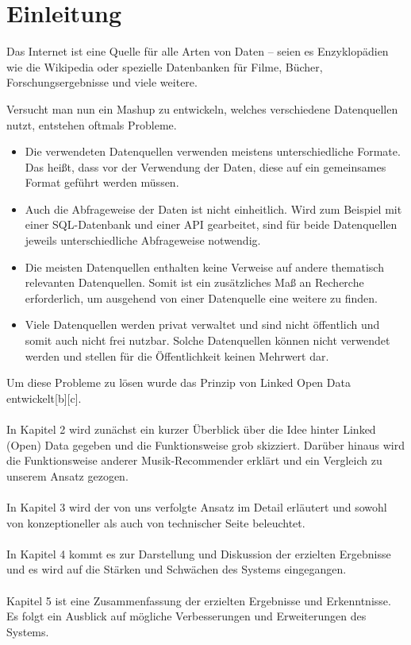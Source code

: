 \section{Einleitung}

Das Internet ist eine Quelle für alle Arten von Daten -- seien es Enzyklopädien wie die Wikipedia oder spezielle Datenbanken für Filme, Bücher, Forschungsergebnisse und viele weitere.


Versucht man nun ein Mashup zu entwickeln, welches verschiedene Datenquellen nutzt, entstehen oftmals Probleme.

\begin{itemize}
\item Die verwendeten Datenquellen verwenden meistens unterschiedliche Formate. Das heißt, dass vor der Verwendung der Daten, diese auf ein gemeinsames Format geführt werden müssen.
\item Auch die Abfrageweise der Daten ist nicht einheitlich. Wird zum Beispiel mit einer SQL-Datenbank und einer API gearbeitet, sind für beide Datenquellen jeweils unterschiedliche Abfrageweise notwendig.
\item Die meisten Datenquellen enthalten keine Verweise auf andere thematisch relevanten Datenquellen. Somit ist ein zusätzliches Maß an Recherche erforderlich, um ausgehend von einer Datenquelle eine weitere zu finden.
\item Viele Datenquellen werden privat verwaltet und sind nicht öffentlich und somit auch nicht frei nutzbar. Solche Datenquellen können nicht verwendet werden und stellen für die Öffentlichkeit keinen Mehrwert dar.
\end{itemize}

Um diese Probleme zu lösen wurde das Prinzip von Linked Open Data entwickelt[b][c].

\paragraph{} In Kapitel 2 wird zunächst ein kurzer Überblick über die Idee hinter Linked (Open) Data gegeben und die Funktionsweise grob skizziert. Darüber hinaus wird die Funktionsweise anderer Musik-Recommender erklärt und ein Vergleich zu unserem Ansatz gezogen.

\paragraph{} In Kapitel 3 wird der von uns verfolgte Ansatz im Detail erläutert und sowohl von konzeptioneller als auch von technischer Seite beleuchtet.

\paragraph{} In Kapitel 4 kommt es zur Darstellung und Diskussion der erzielten Ergebnisse und es wird auf die Stärken und Schwächen des Systems eingegangen.

\paragraph{} Kapitel 5 ist eine Zusammenfassung der erzielten Ergebnisse und Erkenntnisse. Es folgt ein Ausblick auf mögliche Verbesserungen und Erweiterungen des Systems.